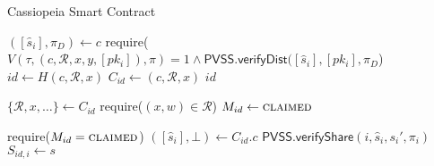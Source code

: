 \begin{algorithm}[H]
\caption{Cassiopeia Smart Contract}
\label{alg:cassiopeia_no_incentives}
    \begin{algorithmic}[1]
            
                \State $([\hat{s}_i], \pi_D) \gets c$
                \State require($V(\tau, (c, \mathcal{R}, x, y, [pk_i]), \pi) = 1 \land \textsf{PVSS.verifyDist}([\hat{s}_i], [pk_i], \pi_D$)
                \State $id \gets H(c, \mathcal{R}, x)$
                \State $C_{id} \gets (c, \mathcal{R}, x)$
                \State \Return $id$
            \EndFunction
            
                \State $\{\mathcal{R}, x, \dots\} \gets C_{id}$
                \State require($(x, w) \in \mathcal{R}$)
                \State $M_{id} \gets \textsc{claimed}$
            \EndFunction
            
                \State require($M_{id} = \textsc{claimed}$)
                \State $([\hat{s}_i], \bot) \gets C_{id}.c$
                \State $\textsf{PVSS.verifyShare}(i, \hat{s}_i, s_i', \pi_i)$
                \State $S_{id,i} \gets s$
            \EndFunction
        \EndContract
    \end{algorithmic}
\end{algorithm}
